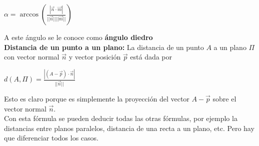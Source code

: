 \documentclass{article}
\theoremstyle{plain}
\theoremstyle{definition}
\begin{document}
\begin{center}
$\displaystyle \alpha= \arccos\left( \frac{|\overrightarrow{n} \cdot \overrightarrow{m}|}{||\overrightarrow{n}|| || \overrightarrow{m}||}\right) $
\end{center}

A este ángulo se le conoce como \textbf{ángulo diedro} \\


\textbf{Distancia de un punto a un plano:} La distancia de un punto $A$ a un plano $\Pi$ con vector normal $\overrightarrow{n}$ y vector posición $\overrightarrow{p}$ está dada por

\begin{center}
$\displaystyle d(A,\Pi) = \frac{| (A-\overrightarrow{p}) \cdot \overrightarrow{n}|}{||\overrightarrow{n}||}$
\end{center}

Esto es claro porque es simplemente la proyección del vector $A-\overrightarrow{p}$ sobre el vector normal $\overrightarrow{n}$. \\

Con esta fórmula se pueden deducir todas las otras fórmulas, por ejemplo la distancias entre planos paralelos, distancia de una recta a un plano, etc. Pero hay que diferenciar todos los casos. \\
\end{document}
